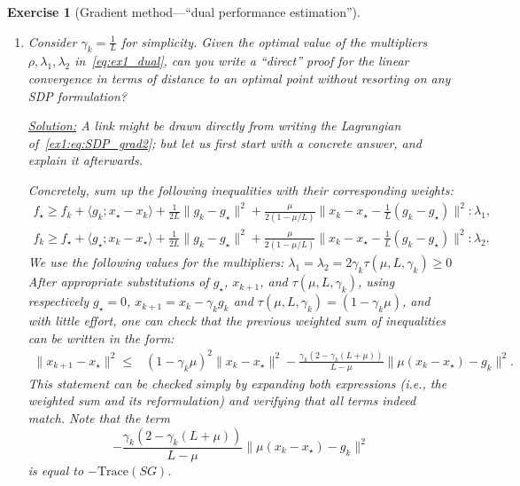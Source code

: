 \documentclass[11pt,a4paper]{article}
\newcommand{\correction}[1]{{{\color{blue}\underline{Solution:} #1}}}
\newcommand{\correction}[1]{}
\newtheorem{exercise}{Exercise}
\begin{document}
\begin{exercise}[Gradient method---``dual performance estimation'']
\begin{enumerate}
	\item Consider $\gamma_k=\frac{1}{L}$ for simplicity. Given the optimal value of the multipliers $\rho,\lambda_1,\lambda_2$ in~\eqref{eq:ex1_dual}, can you write a ``direct'' proof for the linear convergence in terms of distance to an optimal point without resorting on any SDP formulation?
	
	\correction{A link might be drawn directly from writing the Lagrangian of~\eqref{ex1:eq:SDP_grad2}; but let us first start with a concrete answer, and explain it afterwards.
	
	
	Concretely, sum up the following inequalities with their corresponding weights: $$\begin{array}{r}     f_\star \geqslant      f_k+\langle{g_k};{x_\star-x_k}\rangle+\frac{1}{2L}\lVert{g_k-g_\star}\rVert^2+\frac{\mu}{2(1-\mu/L)}\lVert{x_k-x_\star-\frac{{1}}{L}(g_k-g_\star)}\rVert^2  :\lambda_1,  \\     f_k \geqslant      f_\star+\langle{g_\star};{x_k-x_\star}\rangle+\frac{1}{2L}\lVert{g_k-g_\star}\rVert^2+\frac{\mu}{2(1-\mu/L)}\lVert{x_k-x_\star-\frac{{1}}{L}(g_k-g_\star)}\rVert^2:\lambda_2.     \end{array}$$ We use the following values for the multipliers: $\lambda_1=\lambda_2=2\gamma_k\tau(\mu,L,\gamma_k) \geqslant      0$
After appropriate substitutions of $g_\star$, $x_{k+1}$, and $\tau(\mu,L,\gamma_k)$, using respectively $g_\star=0$, $x_{k+1}=x_k-\gamma_k g_k$ and $\tau(\mu,L,\gamma_k)=(1-\gamma_k\mu)$, and with little effort, one can check that the previous weighted sum of inequalities can be written in the form: $$ \begin{array}{rl}    \lVert{x_{k+1}-x_\star}\rVert^2  \leqslant      & \left(1-\gamma_k \mu \right)^2\lVert{x_{k}-x_\star}\rVert^2 -\frac{\gamma_k(2-\gamma_k (L+\mu))}{L-\mu} \lVert{\mu {(x_k  -x_\star)} - g_k}\rVert^2. \end{array}$$ This statement can be checked simply by expanding both expressions (i.e., the weighted sum and its reformulation) and verifying that all terms indeed match. Note that the term \[-\frac{\gamma_k(2-\gamma_k (L+\mu))}{L-\mu} \lVert{\mu {(x_k  -x_\star)} - g_k}\rVert^2\] is equal to $-\mathrm{Trace}(SG)$.

}
\end{enumerate}
\end{exercise}
\end{document}
